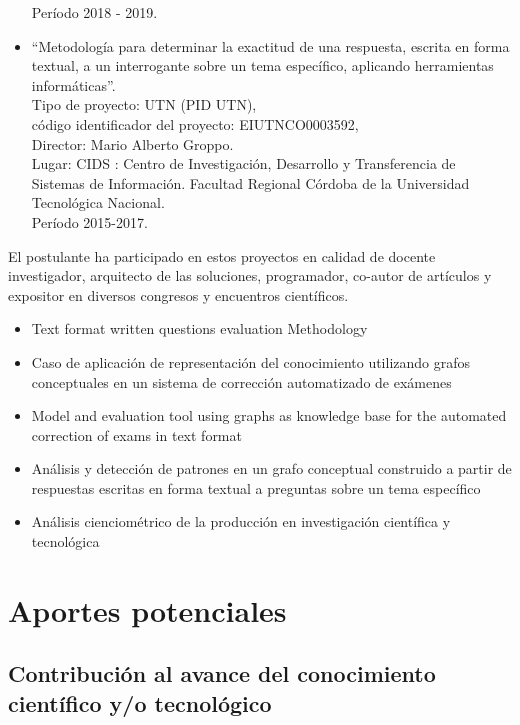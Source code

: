 \documentclass[
	11pt,oneside,a4paper,
	headsepline,footsepline,plainfootsepline,plainheadsepline,
	fleqn,
]{article}
\begin{document}
\begin{itemize}
	      Período 2018 - 2019.
	\item “Metodología para determinar la exactitud de una respuesta, escrita en forma textual, a un interrogante sobre un tema específico, aplicando herramientas informáticas”. \\
	      Tipo de proyecto: UTN (PID UTN), \\
	      código identificador del proyecto: EIUTNCO0003592, \\
	      Director: Mario Alberto Groppo. \\
	      Lugar: CIDS : Centro de Investigación, Desarrollo y Transferencia de Sistemas de Información. Facultad Regional Córdoba de la Universidad Tecnológica Nacional. \\
	      Período 2015-2017.
\end{itemize}

El postulante ha participado en estos proyectos en calidad de docente investigador, arquitecto de las soluciones, programador, co-autor de artículos y expositor en diversos congresos y encuentros científicos.

\begin{itemize}
	\item Text format written questions evaluation Methodology\cite{Menvielle2016}
	\item Caso de aplicación de representación del conocimiento utilizando grafos conceptuales en un sistema de corrección automatizado de exámenes\cite{PazMenvielle2017}
	\item Model and evaluation tool using graphs as knowledge base for the automated correction of exams in text format\cite{Menvielle2017}
	\item Análisis y detección de patrones en un grafo conceptual construido a partir de respuestas escritas en forma textual a preguntas sobre un tema específico\cite{PazMenvielle2018}
	\item Análisis cienciométrico de la producción en investigación científica y tecnológica\cite{Munoz2020}
\end{itemize}

\section{Aportes potenciales}

\subsection*{Contribución al avance del conocimiento científico y/o tecnológico}
\end{document}
